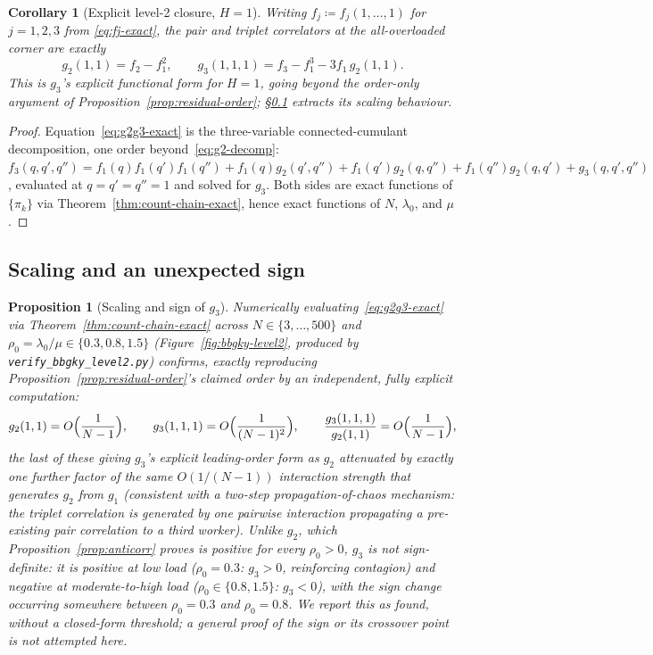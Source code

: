 \documentclass[11pt,a4paper]{report}
\newtheorem{proposition}[theorem]{Proposition}
\newtheorem{corollary}[theorem]{Corollary}
\begin{document}
\begin{corollary}[Explicit level-2 closure, $H=1$]
\label{cor:g2g3-explicit}
Writing $f_j \coloneqq f_j(1,\ldots,1)$ for $j=1,2,3$ from
\eqref{eq:fj-exact}, the pair and triplet correlators at the
all-overloaded corner are exactly
\begin{equation}
  g_2(1,1) = f_2 - f_1^2,
  \qquad
  g_3(1,1,1) = f_3 - f_1^3 - 3 f_1\, g_2(1,1).
  \label{eq:g2g3-exact}
\end{equation}
This is $g_3$'s explicit functional form for $H=1$, going beyond the
order-only argument of Proposition~\ref{prop:residual-order};
\S\ref{sec:level2-scaling} extracts its scaling behaviour.
\end{corollary}

\begin{proof}
Equation~\eqref{eq:g2g3-exact} is the three-variable connected-cumulant
decomposition, one order beyond~\eqref{eq:g2-decomp}:
$f_3(q,q',q'') = f_1(q)f_1(q')f_1(q'') + f_1(q)g_2(q',q'') +
f_1(q')g_2(q,q'') + f_1(q'')g_2(q,q') + g_3(q,q',q'')$, evaluated at
$q=q'=q''=1$ and solved for $g_3$. Both sides are exact functions of
$\{\pi_k\}$ via Theorem~\ref{thm:count-chain-exact}, hence exact
functions of $N$, $\lambda_0$, and $\mu$.
\end{proof}

\subsection{Scaling and an unexpected sign}
\label{sec:level2-scaling}

\begin{proposition}[Scaling and sign of $g_3$]
\label{prop:g3-scaling}
Numerically evaluating~\eqref{eq:g2g3-exact} via
Theorem~\ref{thm:count-chain-exact} across
$N \in \{3,\ldots,500\}$ and $\rho_0 = \lambda_0/\mu \in \{0.3, 0.8,
1.5\}$ (Figure~\ref{fig:bbgky-level2}, produced by
\texttt{verify\_bbgky\_level2.py}) confirms, exactly reproducing
Proposition~\ref{prop:residual-order}'s claimed order by an
independent, fully explicit computation:
\[
  g_2(1,1) = O\Bigl(\frac{1}{N-1}\Bigr),
  \qquad
  g_3(1,1,1) = O\Bigl(\frac{1}{(N-1)^2}\Bigr),
  \qquad
  \frac{g_3(1,1,1)}{g_2(1,1)} = O\Bigl(\frac{1}{N-1}\Bigr),
\]
the last of these giving $g_3$'s explicit leading-order form as $g_2$
attenuated by exactly one further factor of the same $O(1/(N-1))$
interaction strength that generates $g_2$ from $g_1$ (consistent with
a two-step propagation-of-chaos mechanism: the triplet correlation is
generated by one pairwise interaction propagating a pre-existing pair
correlation to a third worker). Unlike $g_2$, which
Proposition~\ref{prop:anticorr} proves is positive for every $\rho_0 >
0$, $g_3$ is \emph{not} sign-definite: it is positive at low load
($\rho_0 = 0.3$: $g_3 > 0$, reinforcing contagion) and negative at
moderate-to-high load ($\rho_0 \in \{0.8, 1.5\}$: $g_3 < 0$), with the
sign change occurring somewhere between $\rho_0 = 0.3$ and $\rho_0 =
0.8$. We report this as found, without a closed-form threshold; a
general proof of the sign or its crossover point is not attempted
here.
\end{proposition}
\end{document}
